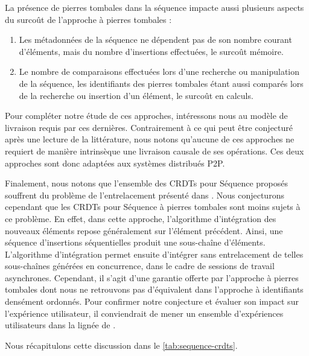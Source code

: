 La présence de pierres tombales dans la séquence impacte aussi plusieurs aspects du surcoût de l'approche à pierres tombales :
\begin{enumerate}
  \item Les métadonnées de la séquence ne dépendent pas de son nombre courant d'éléments, mais du nombre d'insertions effectuées, \ie le surcoût mémoire.
  \item Le nombre de comparaisons effectuées lors d'une recherche ou manipulation de la séquence, les identifiants des pierres tombales étant aussi comparés lors de la recherche ou insertion d'un élément, \ie le surcoût en calculs.
\end{enumerate}

Pour compléter notre étude de ces approches, intéressons nous au modèle de livraison requis par ces dernières.
Contrairement à ce qui peut être conjecturé après une lecture de la littérature, nous notons qu'aucune de ces approches ne requiert de manière intrinsèque une livraison causale de ses opérations.
Ces deux approches sont donc adaptées aux systèmes distribués \ac{P2P}.

Finalement, nous notons que l'ensemble des \acp{CRDT} pour Séquence proposés souffrent du problème de l'entrelacement présenté dans \cite{2019-interleaving-anomalies-collaborative-editors-kleppmann}.
Nous conjecturons cependant que les \acp{CRDT} pour Séquence à pierres tombales sont moins sujets à ce problème.
En effet, dans cette approche, l'algorithme d'intégration des nouveaux éléments repose généralement sur l'élément précédent.
Ainsi, une séquence d'insertions séquentielles produit une sous-chaîne d'éléments.
L'algorithme d'intégration permet ensuite d'intégrer sans entrelacement de telles sous-chaînes générées en concurrence, \eg dans le cadre de sessions de travail asynchrones.
Cependant, il s'agit d'une garantie offerte par l'approche à pierres tombales dont nous ne retrouvons pas d'équivalent dans l'approche à identifiants densément ordonnés.
Pour confirmer notre conjecture et évaluer son impact sur l'expérience utilisateur, il conviendrait de mener un ensemble d'expériences utilisateurs dans la lignée de \cite{2011-evaluation-crdts-ahmed-nacer,2014-effect-delay-collaborative-editing-ignat,2015-cope-delay-collaborative-note-taking-ignat}.

Nous récapitulons cette discussion dans le \autoref{tab:sequence-crdts}.

